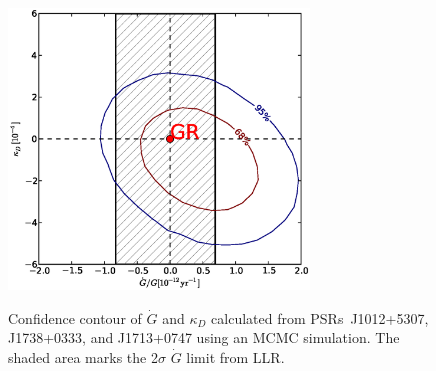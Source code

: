 \documentclass[12pt,preprint]{aastex}
\begin{document}

\begin{figure}
\includegraphics[width=8cm]{finalGdot.ps} \\ 
\caption {\label{fig:Gdot} Confidence contour of $\dot{G}$ and $\kappa_D$
calculated from PSRs~J1012+5307, J1738+0333, and J1713+0747 using an MCMC simulation.
The shaded area marks the 2$\sigma$ $\dot{G}$ limit from LLR. 
} 
\end{figure} 




%




\end{document}
